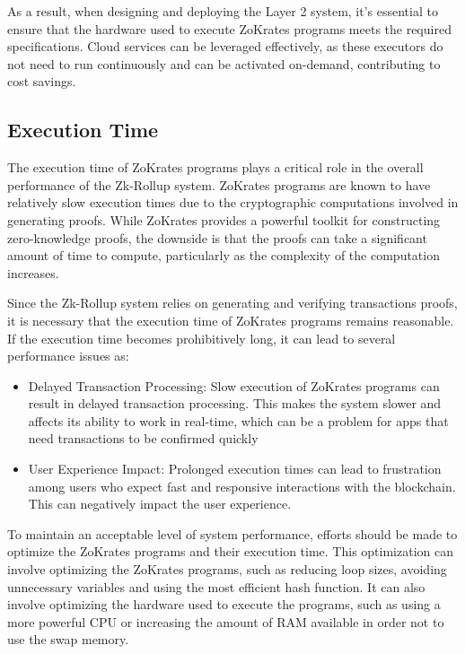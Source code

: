 As a result, when designing and deploying the Layer 2 system, it's essential to ensure that the hardware used to execute ZoKrates programs meets the required specifications. Cloud services can be leveraged effectively, as these executors do not need to run continuously and can be activated on-demand, contributing to cost savings.

\subsection{Execution Time}

The execution time of ZoKrates programs plays a critical role in the overall performance of the Zk-Rollup system. ZoKrates programs are known to have relatively slow execution times due to the cryptographic computations involved in generating proofs. While ZoKrates provides a powerful toolkit for constructing zero-knowledge proofs, the downside is that the proofs can take a significant amount of time to compute, particularly as the complexity of the computation increases.

Since the Zk-Rollup system relies on generating and verifying transactions proofs, it is necessary that the execution time of ZoKrates programs remains reasonable. If the execution time becomes prohibitively long, it can lead to several performance issues as:

\begin{itemize}
    \item Delayed Transaction Processing: Slow execution of ZoKrates programs can result in delayed transaction processing. This makes the system slower and affects its ability to work in real-time, which can be a problem for apps that need transactions to be confirmed quickly
    \item User Experience Impact: Prolonged execution times can lead to frustration among users who expect fast and responsive interactions with the blockchain. This can negatively impact the user experience.
\end{itemize}

To maintain an acceptable level of system performance, efforts should be made to optimize the ZoKrates programs and their execution time. This optimization can involve optimizing the ZoKrates programs, such as reducing loop sizes, avoiding unnecessary variables and using the most efficient hash function. It can also involve optimizing the hardware used to execute the programs, such as using a more powerful CPU or increasing the amount of RAM available in order not to use the swap memory.

